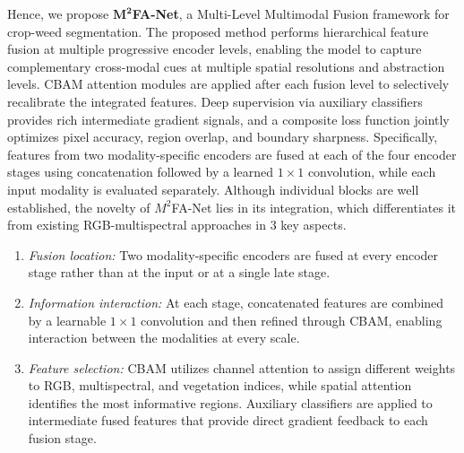 \documentclass[pdflatex,sn-mathphys-num]{sn-jnl}
\newcommand{\rev}[1]{{\color{revisionblue}#1}}
\newenvironment{revblock}{\color{revisionblue}}{}
\begin{document}
Hence, we propose \textbf{$\mathbf{M^2}$FA-Net}, a Multi-Level Multimodal Fusion framework for crop-weed segmentation.
The proposed method performs hierarchical feature fusion at multiple progressive encoder levels, enabling the model to capture complementary cross-modal cues at multiple spatial resolutions and
abstraction levels. CBAM attention modules are applied after each fusion level to selectively recalibrate the integrated
features. Deep supervision via auxiliary classifiers provides rich intermediate gradient signals, and a composite loss
function jointly optimizes pixel accuracy, region overlap, and boundary sharpness. \rev{Specifically, features from two modality-specific encoders are fused at each of the four encoder stages using concatenation followed by a learned $1\times1$ convolution, while each input modality is evaluated separately.}
\begin{revblock}
Although individual blocks are well established, the novelty of $M^2$FA-Net lies in its integration, which differentiates it from existing RGB-multispectral approaches in 3 key aspects.
\begin{enumerate}
    \item\textit{Fusion location:} Two modality-specific encoders are fused at every encoder stage rather than at the input or at a single late stage. 
    \item \textit{Information interaction:} At each stage, concatenated features are combined by a learnable $1\times1$ convolution and then refined through CBAM, enabling interaction between the modalities at every scale. 
    \item \textit{Feature selection:} CBAM utilizes channel attention to assign different weights to RGB, multispectral, and vegetation indices, while spatial attention identifies the most informative regions. Auxiliary classifiers are applied to intermediate fused features that provide direct gradient feedback to each fusion stage.
\end{enumerate}
\end{revblock}
\end{document}
